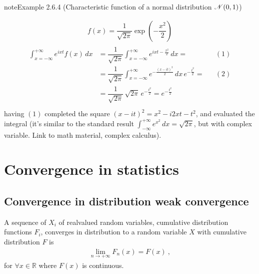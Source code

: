 \documentclass[letterpaper,10pt,english]{jupyterBook}
\begin{document}
\label{ch/prob/characteristic-fun:ex:char-fun:normal}
\begin{sphinxadmonition}{note}{Example 2.6.4 (Characteristic function of a normal distribution \protect\(\mathscr{N}(0,1)\protect\))}


\begin{equation*}
\begin{split}f(x) = \dfrac{1}{\sqrt{2 \pi}} \exp\left( -\dfrac{x^2}{2} \right)\end{split}
\end{equation*}\begin{equation*}
\begin{split}\begin{aligned}
\int_{x=-\infty}^{+\infty} e^{ i x t } f(x) \, dx
& = \dfrac{1}{\sqrt{2 \pi}} \int_{x=-\infty}^{+\infty} e^{ i x t - \frac{x^2}{2} }  \, dx = && (1)  \\
& = \dfrac{1}{\sqrt{2 \pi}} \int_{x=-\infty}^{+\infty} e^{ - \frac{(x-it)^2}{2} }  \, dx \, e^{-\frac{t^2}{2}} = && (2)  \\
& = \dfrac{1}{\sqrt{2 \pi}} \, \sqrt{2 \pi} \, e^{-\frac{t^2}{2}} = e^{-\frac{t^2}{2}}  \\
\end{aligned}\end{split}
\end{equation*}
\sphinxAtStartPar
having \((1)\) completed the square \((x - it)^2 = x^2 - i 2 x t - t^2\), and evaluated the integral  (it’s similar to the standard result \(\int_{-\infty}^{+\infty} e^{x^2} \, dx = \sqrt{2 \pi}\), but with complex variable. Link to math material, complex calculus).
\end{sphinxadmonition}

\sphinxstepscope


\section{Convergence in statistics}
\label{\detokenize{ch/prob/convergence:convergence-in-statistics}}\label{\detokenize{ch/prob/convergence:prob-convergence}}\label{\detokenize{ch/prob/convergence::doc}}

\subsection{Convergence in distribution \sphinxhyphen{} weak convergence}
\label{\detokenize{ch/prob/convergence:convergence-in-distribution-weak-convergence}}\label{\detokenize{ch/prob/convergence:prob-convergence-weak}}
\sphinxAtStartPar
A sequence of \(X_i\) of real\sphinxhyphen{}valued random variables, cumulative distribution functions \(F_i\), converges in distribution to a random variable \(X\) with cumulative distribution \(F\) is
\begin{equation*}
\begin{split}\lim_{n \rightarrow +\infty} F_n(x) = F(x) \ ,\end{split}
\end{equation*}
\sphinxAtStartPar
for \(\forall x \in \mathbb{R}\) where \(F(x)\) is continuous.
\end{document}
